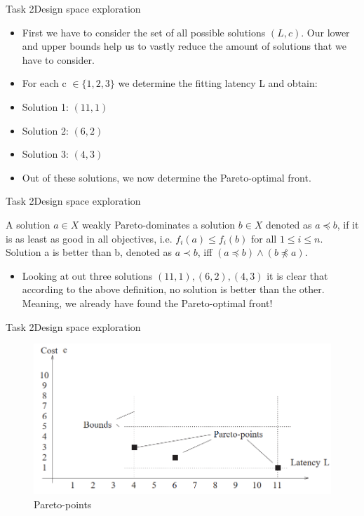 \begin{frame}{Task 2}{Design space exploration}
    \begin{solutionnoinc}
        \begin{itemize}
            \item First we have to consider the set of all possible solutions $(L, c)$. Our lower and upper bounds help us to vastly reduce the amount of solutions that we have to consider.
            \item For each c $\in \{1, 2, 3\}$ we determine the fitting latency L and obtain:
            \item [] Solution 1: $(11, 1)$
            \item [] Solution 2: $(6, 2)$
            \item [] Solution 3: $(4, 3)$
            \item Out of these solutions, we now determine the Pareto-optimal front.
        \end{itemize}
    \end{solutionnoinc}
\end{frame}
\begin{frame}{Task 2}{Design space exploration}
    \begin{requirementsnoinc}
     A solution $a \in X$ weakly Pareto-dominates a solution $b \in X$ denoted as $a \preceq b$, if it is as least as good in all objectives, i.e. $f_i(a) \leq f_i(b)$ for all $1 \leq i \leq n$. Solution a is \alert{better} than b, denoted as $a \prec b$, iff $(a \preceq b) \land (b \npreceq a)$.
    \end{requirementsnoinc}
    \begin{solutionnoinc}
        \begin{itemize}
            \item Looking at out three solutions $(11, 1), (6, 2), (4, 3)$ it is clear that according to the above definition, no solution is \alert{better} than the other. Meaning, we already have found the Pareto-optimal front!
        \end{itemize}
    \end{solutionnoinc}
\end{frame}
\begin{frame}{Task 2}{Design space exploration}
    \begin{solution}
     \begin{figure}
         \centering
         \includegraphics[scale=0.3]{figures/Pareto-points.PNG}
         \caption{Pareto-points}
     \end{figure}
    \end{solution}
\end{frame}

